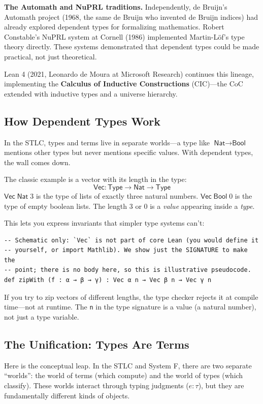 \documentclass[11pt,a4paper]{article}
\theoremstyle{definition}
\begin{document}
\textbf{The Automath and NuPRL traditions.} Independently, de Bruijn's Automath
project (1968, the same de Bruijn who invented de Bruijn indices) had already
explored dependent types for formalizing mathematics. Robert Constable's NuPRL
system at Cornell (1986) implemented Martin-L\"of's type theory directly. These
systems demonstrated that dependent types could be made practical, not just
theoretical.

Lean 4 (2021, Leonardo de Moura at Microsoft Research) continues this lineage,
implementing the \textbf{Calculus of Inductive Constructions} (CIC)---the CoC
extended with inductive types and a universe hierarchy.

\subsection{How Dependent Types Work}

In the STLC, types and terms live in separate worlds---a type
like $\textsf{Nat} \to \textsf{Bool}$ mentions other types but never mentions
specific values. With dependent types, the wall comes down.

The classic example is a vector with its length in the type:
\[
  \textsf{Vec} : \textsf{Type} \to \textsf{Nat} \to \textsf{Type}
\]
$\textsf{Vec}\;\textsf{Nat}\;3$ is the type of lists of exactly three natural
numbers. $\textsf{Vec}\;\textsf{Bool}\;0$ is the type of empty boolean lists.
The length $3$ or $0$ is a \emph{value} appearing inside a \emph{type}.

This lets you express invariants that simpler type systems can't:
\begin{verbatim}
-- Schematic only: `Vec` is not part of core Lean (you would define it
-- yourself, or import Mathlib). We show just the SIGNATURE to make the
-- point; there is no body here, so this is illustrative pseudocode.
def zipWith (f : α → β → γ) : Vec α n → Vec β n → Vec γ n
\end{verbatim}

If you try to zip vectors of different lengths, the type checker rejects it at
compile time---not at runtime. The \texttt{n} in the type signature is a value
(a natural number), not just a type variable.

\subsection{The Unification: Types Are Terms}

Here is the conceptual leap. In the STLC and System F, there are two
separate ``worlds'': the world of terms (which compute) and the world of
types (which classify). These worlds interact through typing judgments
($e : \tau$), but they are fundamentally different kinds of objects.
\end{document}
